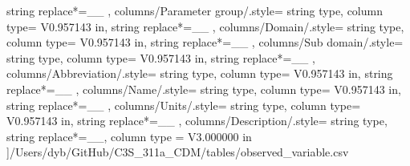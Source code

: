 \begin{landscape}
{            string replace*={_}{\_}
        },
    columns/Parameter group/.style={
            string type, 
            column type= V{0.957143 in}, 
            string replace*={_}{\_}
        },
    columns/Domain/.style={
            string type, 
            column type= V{0.957143 in}, 
            string replace*={_}{\_}
        },
    columns/Sub domain/.style={
            string type, 
            column type= V{0.957143 in}, 
            string replace*={_}{\_}
        },
    columns/Abbreviation/.style={
            string type, 
            column type= V{0.957143 in}, 
            string replace*={_}{\_}
        },
    columns/Name/.style={
            string type, 
            column type= V{0.957143 in}, 
            string replace*={_}{\_}
        },
    columns/Units/.style={
            string type, 
            column type= V{0.957143 in}, 
            string replace*={_}{\_}
        },
    columns/Description/.style={
            string type, 
            string replace*={_}{\_},
            column type = V{3.000000 in}
        }
    ]{/Users/dyb/GitHub/C3S_311a_CDM/tables/observed_variable.csv}
\end{landscape}
